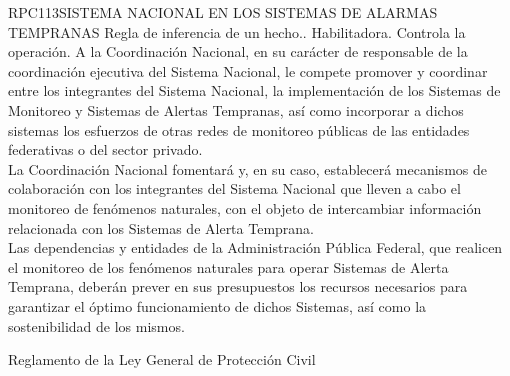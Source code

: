 \begin{BusinessRule}{RPC113}{SISTEMA NACIONAL EN LOS SISTEMAS DE ALARMAS TEMPRANAS}{
		Regla de inferencia de un hecho..
	}{
		Habilitadora. 
	}{
		Controla la operación. %
	}
	\BRItem[Descripción:] A la Coordinación Nacional, en su carácter de responsable de la coordinación ejecutiva del Sistema Nacional, le compete promover y coordinar entre los integrantes del Sistema Nacional, la implementación de los Sistemas de Monitoreo y Sistemas de Alertas Tempranas, así como incorporar a dichos sistemas los esfuerzos de otras redes de monitoreo públicas de las entidades federativas o del sector privado.\\La Coordinación Nacional fomentará y, en su caso, establecerá mecanismos de colaboración con los integrantes del Sistema Nacional que lleven a cabo el monitoreo de fenómenos naturales, con el objeto de intercambiar información relacionada con los Sistemas de Alerta Temprana.\\Las dependencias y entidades de la Administración Pública Federal, que realicen el monitoreo de los fenómenos naturales para operar Sistemas de Alerta Temprana, deberán prever en sus presupuestos los recursos necesarios para garantizar el óptimo funcionamiento de dichos Sistemas, así como la sostenibilidad de los mismos.
	
	
	 Reglamento de la Ley General de Protección Civil
\end{BusinessRule}